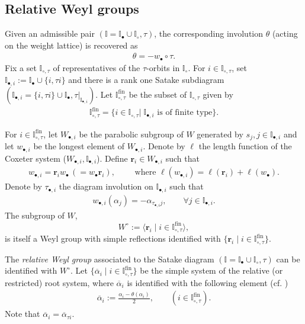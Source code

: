 \documentclass[a4paper,reqno,12pt]{amsart}
\numberwithin{equation}{section}
\theoremstyle{definition}
\theoremstyle{plain}
\theoremstyle{definition}
\def\I{\mathbb I}
\def\bI{\I_\bullet}
\def\wI{\I_\circ}
\def\bIi{\I_{\bullet,i}}
\def\bw{w_\bullet}
\def\bwi{w_{\bullet,i}}
\def\br{\mathbf r}
\def \ov{\overline}
\def \wItau{\I_{\circ,\tau}}
\def \fwItau{\wItau^{\mathrm{fin}}}
\begin{document}
\subsection{Relative Weyl groups}
Given an admissible pair $(\I=\bI \cup \wI,\tau)$, the corresponding involution $\theta$ (acting on the weight lattice) is recovered as
\begin{align}
  \label{eq:theta}
\theta=-\bw \circ \tau.
\end{align}
Fix a set $\I_{\circ,\tau}$ of representatives of the $\tau$-orbits in $\wI$. For $i\in \I_{\circ,\tau}$, set $\I_{\bullet,i}:=\bI\cup \{i,\tau i\}$ and there is a rank one Satake subdiagram $(\I_{\bullet,i}=\{i,\tau i\}\cup\I_\bullet,\tau|_{\I_{\bullet,i}})$. Let $\fwItau$ be the subset of $\wItau$ given by
\begin{align}
\label{def:fwItau}
\fwItau=\{i\in \wItau| \; \I_{\bullet,i} \text{ is of finite type}\}.
\end{align}

  For $i\in\fwItau$, let $W_{\bullet,i}$ be the parabolic subgroup of $W$ generated by $s_j,j\in \I_{\bullet,i}$ and let $w_{\bullet,i}$ be the longest element of $W_{\bullet,i}$. Denote by $\ell$ the length function of the Coxeter system ($W_{\bullet,i},\bIi$).
Define $\br_i\in W_{\bullet,i}$ such that
\begin{align}\label{def:bsi}
\bwi= \br_i w_\bullet \, (=w_\bullet \br_i),
\qquad \text{ where }
\ell(\bwi) = \ell(\br_i) + \ell(w_\bullet).
\end{align}
Denote by $\tau_{\bullet,i}$ the diagram involution on $\bIi$ such that
\begin{align} \label{def:taui}
\bwi(\alpha_j) =-\alpha_{\tau_{\bullet,i} j}, \qquad \forall j\in \bIi.
\end{align}
The subgroup of $W$,
\[
W^\circ :=\langle \br_i\mid i\in \fwItau \rangle,
\]
is itself a Weyl group with simple reflections identified with $\{\br_i \mid i\in \fwItau\}$.

The {\em relative Weyl group} associated to the Satake diagram $(\I=\bI \cup \wI,\tau)$ can be identified with $W^\circ$. Let $\{\ov\alpha_i\mid i\in \fwItau\}$  be the simple system of the relative (or restricted) root system, where $\ov\alpha_i$ is identified with the following element (cf. \cite[\S 2.3]{DK19})
\begin{align}
 \label{def:balpha}
\ov\alpha_i:=\frac{\alpha_i - \theta(\alpha_i)}{2},\qquad (i\in \fwItau).
\end{align}
Note that $\ov\alpha_i=\ov\alpha_{\tau i}$.
\end{document}
